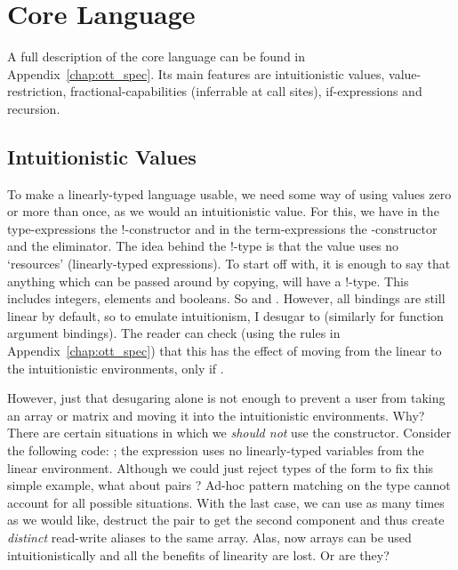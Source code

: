 \section{Core Language}

A full description of the core language can be found in
Appendix~\ref{chap:ott_spec}. Its main features are intuitionistic values,
value-restriction, fractional-capabilities (inferrable at call sites),
if-expressions and recursion.

\subsection{Intuitionistic Values}

To make a linearly-typed language usable, we need some way of using values zero
or more than once, as we would an intuitionistic value. For this, we have in
the type-expressions the !-constructor and in the term-expressions the
-constructor and the  eliminator.
The idea behind the !-type is that the value uses no `resources'
(linearly-typed expressions). To start off with, it is enough to say that
anything which can be passed around by copying, will have a !-type. This
includes integers, elements and booleans. So  and . However, all bindings are still linear by default, so to emulate
intuitionism, I desugar  to   (similarly for function
argument bindings). The reader can check (using the rules in
Appendix~\ref{chap:ott_spec}) that this has the effect of moving 
from the linear to the intuitionistic environments, only if .

However, just that desugaring alone is not enough to prevent a user from taking
an array or matrix and moving it into the intuitionistic environments. Why?
There are certain situations in which we \emph{should not} use the 
constructor.  Consider the following code: ; the expression  uses no linearly-typed variables
from the linear environment. Although we could just reject types of the form
 to fix this simple example, what about pairs ?  Ad-hoc pattern matching on the type cannot
account for all possible situations. With the last case, we can use 
as many times as we would like, destruct the pair to get the second component
and thus create \emph{distinct} read-write aliases to the same array.  Alas,
now arrays can be used intuitionistically and all the benefits of linearity are
lost.  Or are they?


